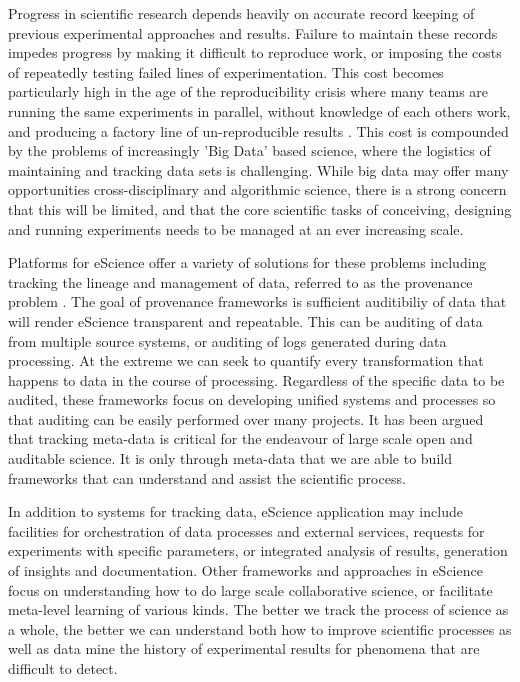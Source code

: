 \documentclass[sigconf]{acmart}
\begin{document}
Progress in scientific research depends heavily on accurate record keeping of previous
experimental approaches and results. Failure to maintain these records impedes progress
by making it difficult to reproduce work, or imposing the costs of repeatedly testing 
failed lines of experimentation. This cost becomes particularly high in the age of the
reproducibility crisis where many teams are running the same experiments in parallel, without
knowledge of each others work, and producing a factory line of un-reproducible results 
\cite{Ioannidis2005}. This cost is compounded by the problems of increasingly 'Big Data' 
based science, where the logistics of maintaining and tracking data sets is challenging.
While big data may offer many opportunities cross-disciplinary and algorithmic science\cite{Schmitt2015}, 
there is a strong concern that this will be limited\cite{Succi2019}, 
and that the core scientific tasks of conceiving,
designing and running experiments needs to be managed at an ever increasing scale.

Platforms for eScience offer a variety of solutions for these problems including  
tracking the lineage and management of data, referred to as 
the provenance problem \cite{Sahoo:2008,Conquest:2021}.
The goal of provenance frameworks is sufficient auditibiliy of data that will 
render eScience transparent and repeatable. This can be auditing of data from multiple 
source systems, or auditing of logs generated during data processing\cite{Ferdous2020}. 
At the extreme we can seek to quantify every transformation that happens to data in 
the course of processing\cite{Sahoo2009}. Regardless of the
specific data to be audited, these frameworks focus on developing unified systems and 
processes so that auditing can be easily performed over many projects. It has been 
argued that tracking meta-data is critical for the endeavour of large scale open and auditable 
science\cite{Reznik2022}. It is only through meta-data that we are able to build frameworks
that can understand and assist the scientific process.

In addition to systems for tracking data, eScience application may include facilities
for orchestration of data processes and external services\cite{Subramanian2013}, 
requests for experiments with specific parameters\cite{Hunter:2005}, 
or integrated analysis of results, generation of insights and documentation. 
Other frameworks and approaches in eScience focus on understanding how to do large 
scale collaborative science, or facilitate meta-level learning of various 
kinds\cite{Hunter:2005,Liu:2023}. The better we track the
process of science as a whole, the better we can understand both how to improve 
scientific processes as well as data mine the history of experimental results for 
phenomena that are difficult to detect.
\end{document}
